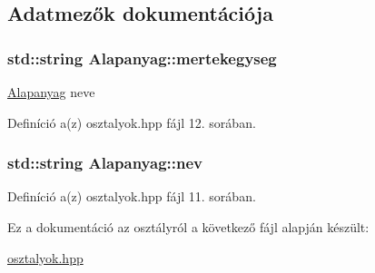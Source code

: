 \subsection{Adatmezők dokumentációja}
\subsubsection[{\texorpdfstring{mertekegyseg}{mertekegyseg}}]{\setlength{\rightskip}{0pt plus 5cm}std\+::string Alapanyag\+::mertekegyseg\hspace{0.3cm}{\ttfamily [private]}}\hypertarget{classAlapanyag_aa0bf609f16b9bcd79ba888991f01e48b}{}\label{classAlapanyag_aa0bf609f16b9bcd79ba888991f01e48b}
\hyperlink{classAlapanyag}{Alapanyag} neve 

Definíció a(z) osztalyok.\+hpp fájl 12. sorában.

\subsubsection[{\texorpdfstring{nev}{nev}}]{\setlength{\rightskip}{0pt plus 5cm}std\+::string Alapanyag\+::nev\hspace{0.3cm}{\ttfamily [private]}}\hypertarget{classAlapanyag_a9c1f11bb5b17c2c897b8f3b9a6a8e502}{}\label{classAlapanyag_a9c1f11bb5b17c2c897b8f3b9a6a8e502}


Definíció a(z) osztalyok.\+hpp fájl 11. sorában.



Ez a dokumentáció az osztályról a következő fájl alapján készült\+:\begin{DoxyCompactItemize}
\item 
\hyperlink{osztalyok_8hpp}{osztalyok.\+hpp}\end{DoxyCompactItemize}
